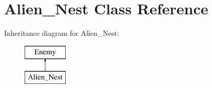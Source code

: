 \hypertarget{class_alien___nest}{}\section{Alien\+\_\+\+Nest Class Reference}
\label{class_alien___nest}
Inheritance diagram for Alien\+\_\+\+Nest\+:\begin{figure}[H]
\begin{center}
\leavevmode
\includegraphics[height=2.000000cm]{class_alien___nest}
\end{center}
\end{figure}
